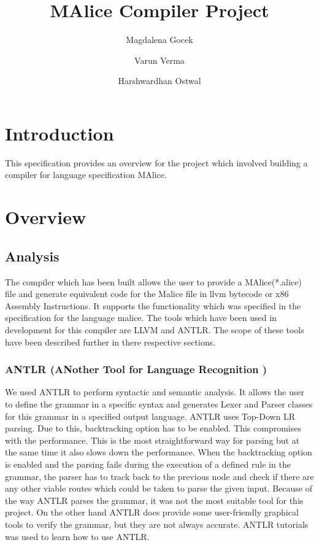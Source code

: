 \documentclass[a4wide, 11pt]{article}
\begin{document}
\title{MAlice Compiler Project}

\author{Magdalena Gocek \and Varun Verma \and Harshwardhan Ostwal}

\maketitle            %

\section{Introduction}
\label{sec:intro}
	This specification provides an overview for the project which involved building a compiler for language specification MAlice.
	
\section{Overview}
	\subsection{Analysis}
		The compiler which has been built allows the user to provide a MAlice(*.alice) file and generate equivalent code
		for the Malice file in llvm bytecode or x86 Assembly Instructions. It supports the functionality which was specified in
		the specification for the language malice. The tools which have been used in development for this compiler are LLVM and ANTLR.
		The scope of these tools have been described further in there respective sections.
		\subsubsection{ANTLR (ANother Tool for Language Recognition )}
			We used ANTLR to perform syntactic and semantic analysis. It allows the user to define the grammar in a 
			specific syntax and generates Lexer and Parser classes for this grammar in a specified output language.
			ANTLR uses Top-Down LR parsing. Due to this, backtracking option has to be enabled. This 
			compromises with the performance. This is the most straightforward way for parsing but at the same
			time it also slows down the performance. When the backtracking option is enabled and the parsing fails during
			the execution of a defined rule in the grammar, the parser has to track back to the previous node and check if there are
			any other viable routes which could be taken to parse the given input. Because of the way 
			ANTLR parses the grammar, it was not the most suitable tool for this project.
			On the other hand ANTLR does provide some user-friendly graphical tools to verify the grammar, but they are not always accurate.
			ANTLR tutorials\cite{antlr} was used to learn how to use ANTLR.
			
\end{document}
